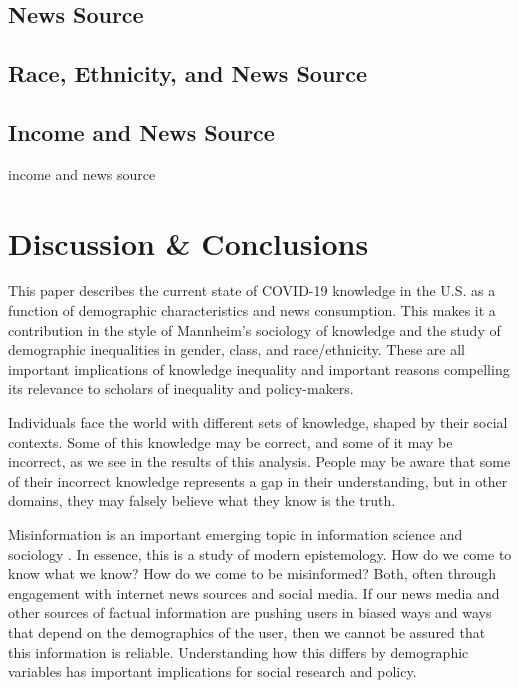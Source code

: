 \documentclass[11pt]{article}
\begin{document}
\subsection{News Source}\label{sec:news source}





\subsection{Race, Ethnicity, and News Source}\label{sec:race-news}



\subsection{Income and News Source}\label{sec:income-news}

 income and news source



\section{Discussion \& Conclusions}\label{sec:conclusion}

This paper describes the current state of COVID-19 knowledge in the U.S. as a
function of demographic characteristics and news consumption. This makes it a
contribution in the style of Mannheim's sociology of knowledge
\citep{Mannheim1929,Swidler1994} and the study of demographic inequalities in
gender, class, and race/ethnicity. These are all important implications of
knowledge inequality and important reasons compelling its relevance to scholars
of inequality and policy-makers.

Individuals face the world with different sets of knowledge, shaped by their
social contexts. Some of this knowledge may be correct, and some of it may be
incorrect, as we see in the results of this analysis. People may be aware that
some of their incorrect knowledge represents a gap in their understanding, but
in other domains, they may falsely believe what they know is the truth.


Misinformation is an important emerging topic in
information science and sociology \citep{Metaxa-Kakavouli2017}. In essence, this
is a study of modern epistemology. How do we come to know what we know? How do
we come to be misinformed? Both, often through engagement with internet news
sources and social media. If our news media and other sources of factual
information are pushing users in biased ways and ways that depend on the
demographics of the user, then we cannot be assured that this information is
reliable. Understanding how this differs by demographic variables has important
implications for social research and policy.
\end{document}
